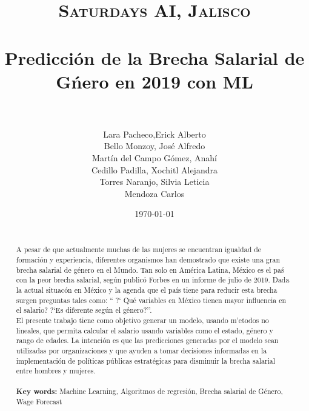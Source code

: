 \documentclass[paper=a4, fontsize=11pt]{scrartcl} %
\title{	
\normalfont \normalsize 
\textsc{Saturdays AI, Jalisco} \\ [25pt] %
\horrule{0.5pt} \\[0.4cm] %
\huge  Predicci\'on de la Brecha Salarial de G\'nero en 2019 con ML \\ %
\horrule{2pt} \\[0.5cm] %
}
\author{  Lara Pacheco,Erick Alberto \\ Bello Monzoy, Jos\'e Alfredo \\ Mart\'in del Campo G\'omez, Anah\'i \\ Cedillo Padilla, Xochitl Alejandra \\ Torres Naranjo, Silvia Leticia \\ Mendoza Carlos} %
\date{\normalsize\today} %
\numberwithin{equation}{section} %
\numberwithin{figure}{section} %
\numberwithin{table}{section} %
\begin{document}
\maketitle %

\newpage
\begin{abstract}

{ }\\
A pesar de que actualmente muchas de las mujeres se encuentran igualdad de formaci\'on y experiencia, diferentes organismos han demostrado que existe una gran brecha salarial de g\'enero en el Mundo. Tan solo en Am\'erica Latina, México es el pa\'s con la peor brecha salarial, seg\'un public\'o Forbes en un informe de julio de 2019. Dada la actual situac\'on en M\'exico y la agenda que el pa\'is tiene para reducir esta brecha surgen preguntas tales como: `` ?` Qu\'e variables en M\'exico tienen mayor influencia en el salario? ?`Es diferente seg\'un el g\'enero?''.
\\El presente trabajo tiene como objetivo generar un modelo, usando m'etodos no lineales, que permita calcular el salario usando variables como el estado, g\'enero y rango de edades. La intenci\'on es que las predicciones generadas por el modelo sean utilizadas por organizaciones y que ayuden a tomar decisiones informadas en la implementaci\'on de pol\'iticas p\'ublicas estrat\'egicas para disminuir la brecha salarial entre hombres y mujeres.
\\
\\
\textbf{Key words:} Machine Learning, Algoritmos de regresi\'on, Brecha salarial de G\'enero, Wage Forecast
    
\end{abstract}

\newpage
\tableofcontents










\newpage


\end{document}
